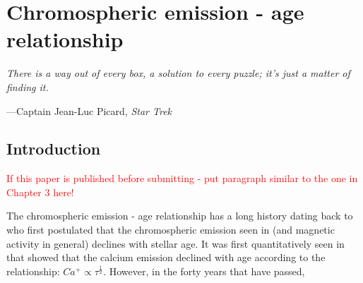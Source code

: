 
\chapter{Chromospheric emission - age relationship} %

\label{Chapter4} %

\epigraph{\itshape There is a way out of every box, a solution to every puzzle; it's just a matter of finding it.}{---Captain Jean-Luc Picard, \itshape Star Trek}

\section{Introduction}
\textcolor{red}{If this paper is published before submitting - put paragraph similar to the one in Chapter 3 here!}

The chromospheric emission - age relationship has a long history dating back to \citet{Wilson_1963} who first postulated that the chromospheric emission seen in \caII (and magnetic activity in general) declines with stellar age. It was first quantitatively seen in \citet{Skumanich_1972} that showed that the calcium emission declined with age according to the relationship: $Ca^{+} \propto \tau^{\frac{1}{2}}$. However, in the forty years that have passed,

